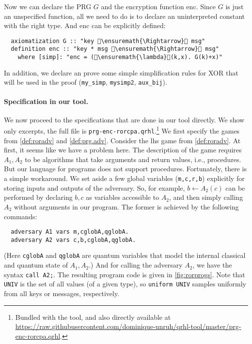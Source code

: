 \documentclass{article}
\newcommand\giturl[1]{\url{https://raw.githubusercontent.com/dominique-unruh/qrhl-tool/master/#1}}
\begin{document}
Now we can declare the PRG $G$
and the encryption function $\mathrm{enc}$.
Since $G$
is just an unspecified function, all we need to do is to declare an
uninterpreted constant with the right type. And $\mathrm{enc}$
can be explicitly defined:
\begin{lstlisting}
  axiomatization G :: "key \ensuremath{\Rightarrow} msg"
  definition enc :: "key * msg \ensuremath{\Rightarrow} msg"
    where [simp]: "enc = (\ensuremath{\lambda}(k,x). G(k)+x)"
\end{lstlisting}

In addition, we declare an prove some simple simplification rules for XOR
that will be used in the proof (\texttt{my\_simp}, \texttt{mysimp2}, \texttt{aux\_bij}).

\paragraph{Specification in our tool.} We now proceed to the
specifications that are done in our tool directly. We show only
excerpts, the full file is
\texttt{prg-enc-rorcpa.qrhl}.\footnote{Bundled with the tool, and also
  directly available at \giturl{prg-enc-rorcpa.qrhl}.}  We first specify the games
from \autoref{def:roradv} and \autoref{def:prg.adv}. Consider the lhs
game from \autoref{def:roradv}. At first, it seems like we have a
problem here. The description of the game requires $A_1,A_2$
to be algorithms that take arguments and return values, i.e.,
procedures. But our language for programs does not support
procedures. Fortunately, there is a simple workaround. We set aside a
few global variables (\texttt{m,c,r,b}) explicitly for storing inputs
and outputs of the adversary. So, for example, $b\leftarrow A_2(c)$
can be performed by declaring $b,c$
as variables accessible to $A_2$,
and then simply calling $A_2$
without arguments in our program. The former is achieved by the
following commands:
\begin{lstlisting}
  adversary A1 vars m,cglobA,qglobA.
  adversary A2 vars c,b,cglobA,qglobA.
\end{lstlisting}
(Here \texttt{cglobA} and \texttt{qglobA} are quantum variables that
model the internal classical and quantum state of $A_1,A_2$.)
And for calling the adversary $A_2$,
we have the syntax \texttt{call A2;}. The resulting program code is
given in \autoref{fig:rorprogs}. Note that \texttt{UNIV} is the set of
all values (of a given type), so \texttt{uniform UNIV} samples
uniformly from all keys or messages, respectively.
\end{document}

